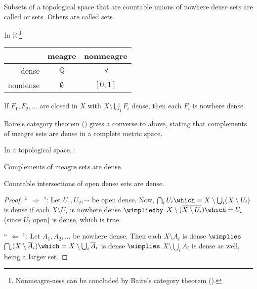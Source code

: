 	Subsets of a topological space that are countable unions of nowhere dense sets are called  or  sets. Others are called  sets.
	
	\begin{rmk}
		In $\mathbb R$:\footnote{Nonmeagre-ness can be concluded by Baire's category theorem ().}
		\begin{center}
			\begin{tabular}{r|cc}
				& meagre & nonmeagre\\
				\hline
				dense & $\mathbb Q$ & $\mathbb R$\\
				nondense & $\emptyset$ & $[0, 1]$
			\end{tabular}
		\end{center}
	\end{rmk}
	
	\begin{lem}
		If $F_1, F_2, \ldots$ are closed in $X$ with $X\setminus\bigcup_i F_i$ dense, then each $F_i$ is nowhere dense.
	\end{lem}
	
	\begin{rmk}
		Baire's category theorem () gives a converse to above, stating that complements of meagre sets are dense in a complete metric space.
	\end{rmk}
	
	\begin{prp}\label{PRP: versions of BCT}
		In a topological space, \tfae:
		\begin{mylist}
			\item\label{PRPi: versions of BCT} Complements of meagre sets are dense.
			\item\label{PRPii: versions of BCT} Countable intersections of open dense sets are dense.
		\end{mylist}
	\end{prp}
	
	\begin{proof}
		`` $\Rightarrow$ '': Let $U_1, U_2, \cdots$ be open dense. Now, $\bigcap_i U_i \which= X\setminus\bigcup_i(X\setminus U_i)$ is dense if each $X\setminus U_i$ is nowhere dense $\wimpliedby$ $X\setminus(\overline{X\setminus U_i})\which= U_i$ (since \uline{$U_i$ open}) is \uline{dense}, which is true.
		
		`` $\Leftarrow$ '': Let $A_1, A_2, \ldots$ be nowhere dense. Then each $X\setminus\overline A_i$ is dense $\wimplies$ $\bigcap_i(X\setminus \overline A_i)\which= X\setminus\bigcup_i\overline A_i$ is dense $\wimplies$ $X\setminus\bigcup_i A_i$ is dense as well, being a larger set.
	\end{proof}
	
